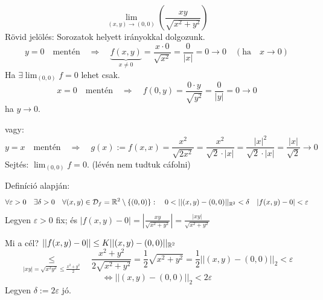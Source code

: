 \documentclass[a4paper,11.5pt]{article}
\begin{document}
	\begin{task}
		\[ \lim_{(x,y)\to(0,0)}\left(\frac{xy}{\sqrt{x^2+y^2}}\right) \]
		Rövid jelölés: Sorozatok helyett irányokkal dolgozunk.
		\[ y=0\quad \text{mentén}\quad \Rightarrow\quad \underbrace{f(x,y)}_{x\not=0}=\frac{x\cdot0}{\sqrt{x^2}}=\frac{0}{|x|}=0\to0\quad (\text{ha}\quad x\to0) \]
		Ha $\exists\lim_{(0,0)}f=0$ lehet csak.
		\[ x=0\quad \text{mentén}\quad \Rightarrow\quad f(0,y)=\frac{0\cdot y}{\sqrt{y^2}}=\frac{0}{|y|}=0\to 0 \]
		ha $y\to0$.
		
		\smallskip
		vagy:
		\[ y=x\quad \text{mentén}\quad \Rightarrow\quad g(x):=f(x,x)=\frac{x^2}{\sqrt{2x^2}}=\frac{x^2}{\sqrt{2}\cdot|x|}=\frac{|x|^2}{\sqrt{2}\cdot|x|}=\frac{|x|}{\sqrt{2}}\to0 \]
		Sejtés: $\lim_{(0,0)}f=0$. (lévén nem tudtuk cáfolni)
		
		Definíció alapján:
		\[ \forall\varepsilon>0\quad \exists\delta>0\quad \forall(x,y)\in\mathcal{D}_f=\R^2\setminus\{(0,0)\}:\quad 0<||(x,y)-(0,0)||_{\R^2}<\delta\quad |f(x,y)-0|<\varepsilon \]
		Legyen $\varepsilon>0$ fix; és $|f(x,y)-0|=\left|\frac{xy}{\sqrt{x^2+y^2}}\right|=\frac{|xy|}{\sqrt{x^2+y^2}}$
		
		Mi a cél? $||f(x,y)-0||\leq K||(x,y)-(0,0)||_{\mathbb{R}{^2}}$
		\[ \underset{|xy|=\sqrt{x^2y^2}\leq\frac{x^2+y^2}{2}}{\leq}\quad\frac{x^2+y^2}{2\sqrt{x^2+y^2}}=\frac{1}{2}\sqrt{x^2+y^2}=\frac{1}{2}||(x,y)-(0,0)||_2<\varepsilon  \]
		\[ \Leftrightarrow||(x,y)-(0,0)||_2<2\varepsilon \]
		Legyen $\delta:=2\varepsilon$ jó.
	\end{task}
\end{document}
